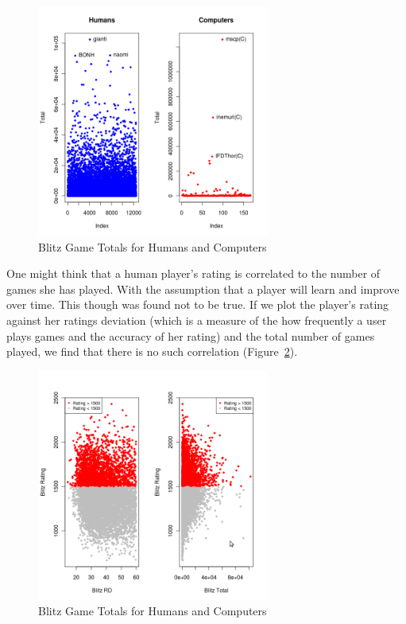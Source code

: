 \documentclass{article}
\begin{document}
\begin{figure} [htp]
\begin{center}
\includegraphics[width=3in]{game_totals.png}
\end{center}
\caption{Blitz Game Totals for Humans and Computers}
\label{fig:gametotals}
\end{figure}



One might think that a human player's rating is correlated to the number of games she has played. With the assumption that a player will learn and improve over time. This though was found not to be true. If we plot the player's rating against her ratings deviation (which is a measure of the how frequently a user plays games and the accuracy of her rating) and the total number of games played, we find that there is no such correlation (Figure~\ref{fig:ratingsrdtotal}).\\

\begin{figure} [htp]
\begin{center}
\includegraphics[width=3in]{ratings_rd_total.png}
\end{center}
\caption{Blitz Game Totals for Humans and Computers}
\label{fig:ratingsrdtotal}
\end{figure}
\end{document}
